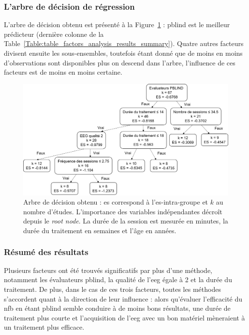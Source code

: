 \subsubsection{L'arbre de décision de régression}

L'arbre de décision obtenu est présenté à la Figure~\ref{Figure:factors_decision_tree} : \gls{pblind} est le meilleur prédicteur (dernière colonne de la
Table~\ref{Table:table_factors_analysis_results_summary}). Quatre autres facteurs divisent ensuite les sous-ensembles, toutefois étant donné que de moins
en moins d'observations sont disponibles plus on descend dans l'arbre, l'influence de ces facteurs est de moins en moins certaine.

\begin{figure}[h!]
  \centering
	\includegraphics[width=1\linewidth]{figures/chapter-3/factors-decision-tree} 
  \caption{Arbre de décision obtenu : \gls{es} correspond à l'\gls{es}-intra-groupe et $k$ au nombre d'études. L'importance des variables indépendantes
	décroît depuis le \textit{root node}. La durée de la session est mesurée en minutes, la durée du traitement en semaines et l'âge en années.}
  \label{Figure:factors_decision_tree}
\end{figure}

\subsubsection{Résumé des résultats}

Plusieurs facteurs ont été trouvés significatifs par plus d'une méthode, notamment les évaluateurs \gls{pblind}, la qualité de l'\gls{eeg} égale à 2 et la durée du traitement. 
De plus, dans le cas de ces trois facteurs, toutes les méthodes s'accordent quant à la direction de leur influence : alors qu'évaluer l'efficacité du \gls{nfb} en étant \gls{pblind}
semble conduire à de moins bons résultats, une durée de traitement plus courte et l'acquisition de l'\gls{eeg} avec un bon matériel mèneraient à un traitement plus efficace. 

